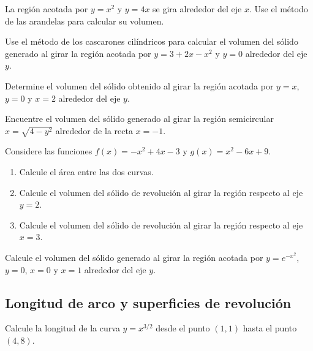 \begin{prob}
La región acotada por $y = x^2$ y $y = 4x$ se gira alrededor del eje $x$. Use el método de las arandelas para calcular su volumen.
\end{prob}

\begin{prob}
Use el método de los cascarones cilíndricos para calcular el volumen del sólido generado al girar la región acotada por $y = 3 + 2x - x^2$ y $y = 0$ alrededor del eje $y$.
\end{prob}

\begin{prob}
Determine el volumen del sólido obtenido al girar la región acotada por $y = x$, $y = 0$ y $x = 2$ alrededor del eje $y$.
\end{prob}


\begin{prob}
Encuentre el volumen del sólido generado al girar la región semicircular $x = \sqrt{4-y^2}$ alrededor de la recta $x = -1$.
\end{prob}

\begin{prob}
Considere las funciones $f(x)=-x^2+4x-3$ y $g(x)=x^2-6x+9$.
\begin{enumerate} 
  \item Calcule el área entre las dos curvas.
  \item Calcule el volumen del sólido de revolución al girar la región respecto al eje $y=2$.
  \item Calcule el volumen del sólido de revolución al girar la región respecto al eje $x=3$.
\end{enumerate}
\end{prob}

\begin{prob}
Calcule el volumen del sólido generado al girar la región acotada por $y = e^{-x^2}$, $y = 0$, $x = 0$ y $x = 1$ alrededor del eje $y$.
\end{prob}

\subsection{Longitud de arco y superficies de revolución}


\begin{prob}
Calcule la longitud de la curva $y = x^{3/2}$ desde el punto $(1, 1)$ hasta el punto $(4, 8)$.
\end{prob}

